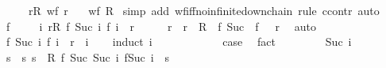 \begin{isabellebody}
\ \ \ \ \ {\isachardoublequoteopen}{\isasymforall}r{\isasymin}R{\isachardot}{\kern0pt}\ wf\ r{\isachardoublequoteclose}\isanewline
\ \ \ {\isachardoublequoteopen}wf\ {\isacharparenleft}{\kern0pt}{\isasymUnion}R{\isacharparenright}{\kern0pt}{\isachardoublequoteclose}\isanewline
%
\isadelimproof
%
\endisadelimproof
%
\isatagproof
{}\isamarkupfalse%
\ {\isacharparenleft}{\kern0pt}simp\ add{\isacharcolon}{\kern0pt}\ wf{\isacharunderscore}{\kern0pt}iff{\isacharunderscore}{\kern0pt}no{\isacharunderscore}{\kern0pt}infinite{\isacharunderscore}{\kern0pt}down{\isacharunderscore}{\kern0pt}chain{\isacharcomma}{\kern0pt}\ rule\ ccontr{\isacharcomma}{\kern0pt}\ auto{\isacharparenright}{\kern0pt}\isanewline
\ \ \isamarkupfalse%
\ f\isanewline
\ \ \isamarkupfalse%
\ {}{\isacharcolon}{\kern0pt}\ {\isachardoublequoteopen}{\isasymforall}i{\isachardot}{\kern0pt}\ {\isasymexists}r{\isasymin}R{\isachardot}{\kern0pt}\ {\isacharparenleft}{\kern0pt}f\ {\isacharparenleft}{\kern0pt}Suc\ i{\isacharparenright}{\kern0pt}{\isacharcomma}{\kern0pt}\ f\ i{\isacharparenright}{\kern0pt}\ {\isasymin}\ r{\isachardoublequoteclose}\isanewline
\ \ \isamarkupfalse%
\ \isamarkupfalse%
\ r\ \ {\isachardoublequoteopen}r\ {\isasymin}\ R{\isachardoublequoteclose}\ \ {\isachardoublequoteopen}{\isacharparenleft}{\kern0pt}f\ {\isacharparenleft}{\kern0pt}Suc\ {}{\isacharparenright}{\kern0pt}{\isacharcomma}{\kern0pt}\ f\ {}{\isacharparenright}{\kern0pt}\ {\isasymin}\ r{\isachardoublequoteclose}\ \isamarkupfalse%
\ auto\isanewline
\ \ \isamarkupfalse%
\ {\isachardoublequoteopen}{\isacharparenleft}{\kern0pt}f\ {\isacharparenleft}{\kern0pt}Suc\ i{\isacharparenright}{\kern0pt}{\isacharcomma}{\kern0pt}\ f\ i{\isacharparenright}{\kern0pt}\ {\isasymin}\ r{\isachardoublequoteclose}\ \ i\isanewline
\ \ \isamarkupfalse%
\ {\isacharparenleft}{\kern0pt}induct\ i{\isacharparenright}{\kern0pt}\isanewline
\ \ \ \ \isamarkupfalse%
\ {}\isanewline
\ \ \ \ \isamarkupfalse%
\ {\isacharquery}{\kern0pt}case\ \isamarkupfalse%
\ fact\isanewline
\ \ \isamarkupfalse%
\isanewline
\ \ \ \ \isamarkupfalse%
\ {\isacharparenleft}{\kern0pt}Suc\ i{\isacharparenright}{\kern0pt}\isanewline
\ \ \ \ \isamarkupfalse%
\ \isamarkupfalse%
\ s\ \ s{\isacharcolon}{\kern0pt}\ {\isachardoublequoteopen}s\ {\isasymin}\ R{\isachardoublequoteclose}\ {\isachardoublequoteopen}{\isacharparenleft}{\kern0pt}f\ {\isacharparenleft}{\kern0pt}Suc\ {\isacharparenleft}{\kern0pt}Suc\ i{\isacharparenright}{\kern0pt}{\isacharparenright}{\kern0pt}{\isacharcomma}{\kern0pt}\ f{\isacharparenleft}{\kern0pt}Suc\ i{\isacharparenright}{\kern0pt}{\isacharparenright}{\kern0pt}\ {\isasymin}\ s{\isachardoublequoteclose}\isanewline

\end{isabellebody}
